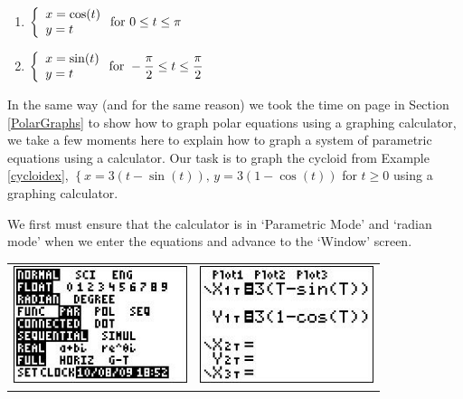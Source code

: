 \documentclass{ximera}
\begin{document}
\begin{multicols}{2} \raggedcolumns 
\begin{enumerate}
\setcounter{enumi}{\value{HW}}

\item ${\displaystyle \left\{ \begin{array}{l} x = \cos(t) \\ y = t \end{array} \right. \vspace{.25in} \mbox{for } 0 \leq t \leq \pi}$
\item ${\displaystyle \left\{ \begin{array}{l} x = \sin(t) \\ y = t \end{array} \right. \vspace{.25in} \mbox{for } -\dfrac{\pi}{2} \leq t \leq \dfrac{\pi}{2}}$ \label{paraplotlast}

\setcounter{HW}{\value{enumi}}
\end{enumerate}
\end{multicols}

\newpage

In the same way (and for the same reason) we took the time on page \pageref{polargraphscalculator} in Section \ref{PolarGraphs} to show how to graph polar equations using a graphing calculator, we take a few moments here to explain how to graph a system of parametric equations using a calculator.  Our task is to graph the cycloid from Example \ref{cycloidex},  $\left\{ x = 3(t -\sin(t)), \, y = 3(1-\cos(t)) \right.$ for $t \geq 0$ using a graphing calculator.

\smallskip

We first must ensure that the calculator is in `Parametric Mode' and `radian mode' when we enter the equations and advance to the `Window' screen. 

\begin{center}

\begin{tabular}{cc}

\includegraphics[width=2in]{./ParametricEquationsGraphics/Parametric01.jpg} &
\hspace{0.75in} \includegraphics[width=2in]{./ParametricEquationsGraphics/Parametric02.jpg} \\

\end{tabular} 

\end{center}
\end{document}
